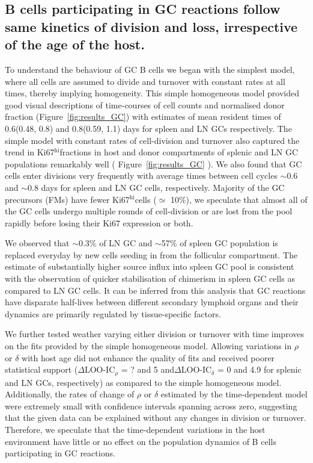 \documentclass[11pt]{article}
\newcommand{\khi}{Ki67$^\text{hi}$}
\begin{document}
\subsection*{B cells participating in GC reactions follow same kinetics of division and loss, irrespective of the age of the host.}
To understand the behaviour of GC B cells we began with the simplest model, where all cells are assumed to divide and turnover with constant rates at all times, thereby implying homogeneity.
This simple homogeneous model provided good visual descriptions of time-courses of cell counts and normalised donor fraction (Figure~\ref{fig:results_GC}) with estimates of mean resident times of 0.6(0.48, 0.8) and 0.8(0.59, 1.1) days for spleen and LN GCs respectively.
The simple model with constant rates of cell-division and turnover also captured the trend in \khi fractions in host and donor compartments of splenic and LN GC populations remarkably well ( Figure~\ref{fig:results_GC} ). 
We also found that GC cells enter divisions very frequently with average times between cell cycles $\sim$0.6 and $\sim$0.8 days for spleen and LN GC cells, respectively.
Majority of the GC precursors (FMs) have fewer \khi cells ($\simeq$ 10\%), we speculate that almost all of the GC cells undergo multiple rounds of cell-division or are lost from the pool rapidly before losing their Ki67 expression or both.

We observed that $\sim$0.3\% of LN GC and $\sim$57\% of spleen GC population is replaced everyday by new cells seeding in from the follicular compartment.
The estimate of substantially higher source influx into spleen GC pool is consistent with the observation of quicker stabilisation of chimerism in spleen GC cells as compared to LN GC cells. 
It can be inferred from this analysis that GC reactions have disparate half-lives between different secondary lymphoid organs and their dynamics are primarily regulated by tissue-specific factors.

We further tested weather varying either division or turnover with time improves on the fits provided by the simple homogeneous model. 
Allowing variations in $\rho$ or $\delta$ with host age did not enhance the quality of fits and received poorer statistical support ($\Delta$LOO-IC$_{\rho}$ = ? and 5 and$\Delta$LOO-IC$_{\delta}$ = 0 and 4.9  for splenic and LN GCs, respectively) as compared to the simple homogeneous model. 
Additionally, the rates of change of $\rho$ or $\delta$ estimated by the time-dependent model were extremely small with confidence intervals spanning across zero, suggesting that the given data can be explained without any changes in division or turnover. %
Therefore, we speculate that the time-dependent variations in the host environment have little or no effect on the population dynamics of B cells participating in GC reactions.
\end{document}
